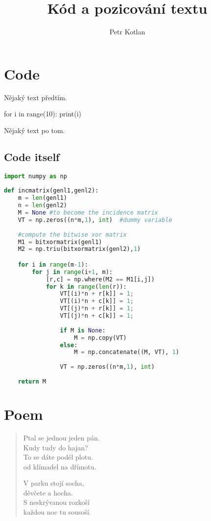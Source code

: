 \documentclass[a4paper, 12pt]{article}
\author{Petr Kotlan}
\title{Kód a pozicování textu}
\begin{document}
\pagecolor{moleskin}
\maketitle
\tableofcontents
\pagebreak

\section{Code}
\noindent Nějaký text předtím.
\begin{verbatim*}
    for i in range(10):
    print(i)
\end{verbatim*}
Nějaký text po tom.

\subsection{Code itself}
\begin{lstlisting}[language=Python, caption=Python example]
import numpy as np
    
def incmatrix(genl1,genl2):
    m = len(genl1)
    n = len(genl2)
    M = None #to become the incidence matrix
    VT = np.zeros((n*m,1), int)  #dummy variable
    
    #compute the bitwise xor matrix
    M1 = bitxormatrix(genl1)
    M2 = np.triu(bitxormatrix(genl2),1) 

    for i in range(m-1):
        for j in range(i+1, m):
            [r,c] = np.where(M2 == M1[i,j])
            for k in range(len(r)):
                VT[(i)*n + r[k]] = 1;
                VT[(i)*n + c[k]] = 1;
                VT[(j)*n + r[k]] = 1;
                VT[(j)*n + c[k]] = 1;
                
                if M is None:
                    M = np.copy(VT)
                else:
                    M = np.concatenate((M, VT), 1)
                
                VT = np.zeros((n*m,1), int)
    
    return M
    \end{lstlisting}

\pagebreak

\section{Poem}
\begin{verse}
    Ptal se jednou jeden pán.\\
    Kudy tudy do hajan?\\
    To se dáte podél plotu.\\
    od klímadel na dřímotu.

    V parku stojí socha,\\
    děvčete a hocha.\\
    S neskrývanou rozkoší\\
    každou noc tu sousoší.



\end{verse}
\end{document}
